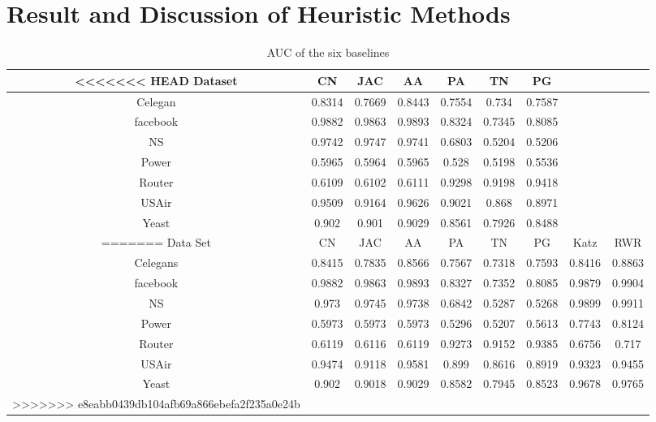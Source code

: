 \documentclass[12pt]{article}
\begin{document}
\section{Result and Discussion of Heuristic Methods}
\begin{table}
	\begin{center}
		\begin{tabular}{|c|c|c|c|c|c|c|c|c|}
			\hline
<<<<<<< HEAD
			Dataset & CN & JAC & AA & PA  & TN & PG \\
			\hline
			Celegan&0.8314&0.7669&0.8443&0.7554&0.734&0.7587\\
			facebook&0.9882&0.9863&0.9893&0.8324&0.7345&0.8085\\
			NS&0.9742&0.9747&0.9741&0.6803&0.5204&0.5206\\
			Power&0.5965&0.5964&0.5965&0.528&0.5198&0.5536\\
			Router&0.6109&0.6102&0.6111&0.9298&0.9198&0.9418\\
			USAir&0.9509&0.9164&0.9626&0.9021&0.868&0.8971\\
			Yeast&0.902&0.901&0.9029&0.8561&0.7926&0.8488\\
=======
			Data Set & CN & JAC & AA & PA  & TN & PG & Katz & RWR\\
			\hline
			Celegans&0.8415&0.7835&0.8566&0.7567&0.7318&0.7593&0.8416&0.8863\\
			facebook&0.9882&0.9863&0.9893&0.8327&0.7352&0.8085&0.9879&0.9904\\
			NS&0.973&0.9745&0.9738&0.6842&0.5287&0.5268&0.9899&0.9911\\
			Power&0.5973&0.5973&0.5973&0.5296&0.5207&0.5613&0.7743&0.8124\\
			Router&0.6119&0.6116&0.6119&0.9273&0.9152&0.9385&0.6756&0.717\\
			USAir&0.9474&0.9118&0.9581&0.899&0.8616&0.8919&0.9323&0.9455\\
			Yeast&0.902&0.9018&0.9029&0.8582&0.7945&0.8523&0.9678&0.9765\\
>>>>>>> e8eabb0439db104afb69a866ebefa2f235a0e24b
			\hline
		\end{tabular}
	\end{center}
	\caption{AUC of the six baselines}
	\label{tab:auc}
\end{table}
\end{document}
